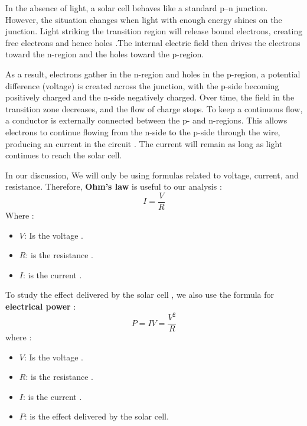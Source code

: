 \documentclass[12pt]{article}
\begin{document}
In the absence of light, a solar cell behaves like a standard p–n junction. However, the situation changes when light with enough energy shines on the junction. Light striking the transition region will release bound electrons, creating free electrons and hence holes .The internal electric field then drives the electrons toward the n-region and the holes toward the p-region.
\newline

As a result, electrons gather  in the n-region and holes in the p-region, a potential difference (voltage) is created across the junction, with the p-side becoming positively charged and the n-side negatively charged.
Over time, the field in the transition zone decreases, and the flow of charge   stops. To keep a continuous flow, a  conductor is externally connected between the p- and n-regions. This allows electrons to continue  flowing from the n-side to the p-side through the wire, producing an  current in the circuit . The current will remain as long as light continues to reach the solar cell.
\newline

In our discussion, We will only be using formulas related to voltage, current, and resistance. Therefore, \textbf{ Ohm's law }is useful to our analysis : 
\begin{equation}
I = \frac{V}{R}
\label{eq:v/r}
\end{equation}
Where :
\begin{itemize}
    \item \( V \): Is the voltage  .
    \item \( R \): is the resistance . 
    \item \( I \): is the current .
\end{itemize}

To study the effect delivered by the solar cell , we also use the formula for\textbf{ electrical power} : 
\begin{equation}
P = IV =  \frac{V^2}{R}
\label{eq:IV}
\end{equation}
where :
\begin{itemize}
    \item \( V \): Is the voltage  .
    \item \( R \): is the resistance . 
    \item \( I \): is the current .
    \item \( P \): is the effect delivered by the solar cell.
\end{itemize}
\end{document}
